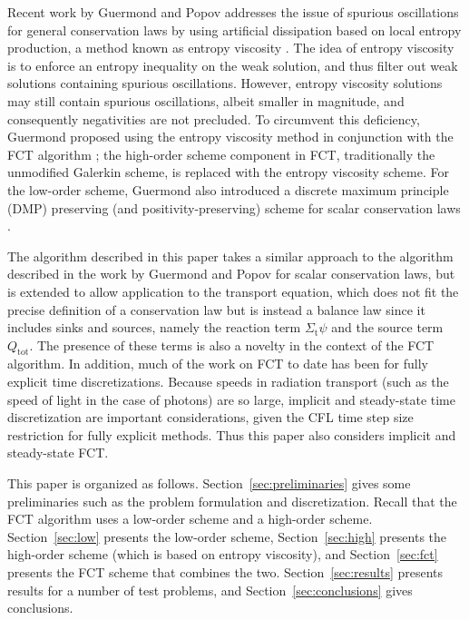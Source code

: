 \documentclass[xchauthor,chkrefs,fixeqskip,GCNS,amsmath,amsthm]{yjcphg}
\theoremstyle{remark}
\begin{document}
Recent work by Guermond and Popov addresses the issue of spurious
oscillations for general conservation laws by using artificial
dissipation based on local entropy production, a method known as entropy
viscosity \cite{guermond_ev}. The idea of entropy viscosity is to
enforce an entropy inequality on the weak solution, and thus filter out
weak solutions containing spurious oscillations. However, entropy
viscosity solutions may still contain spurious oscillations, albeit
smaller in magnitude, and consequently negativities are not precluded.
To circumvent this deficiency, Guermond proposed using the entropy
viscosity method in conjunction with the FCT algorithm
\cite{guermond_secondorder}; the high-order scheme component in FCT,
traditionally the unmodified Galerkin scheme, is replaced with the
entropy viscosity scheme. For the low-order scheme, Guermond also
introduced a discrete maximum principle (DMP) preserving (and
positivity-preserving) scheme for scalar conservation laws
\cite{guermond_firstorder}.

The algorithm described in this paper takes a similar approach to the
algorithm described in the work by Guermond and Popov for scalar
conservation laws, but is extended to allow application to the transport
equation, which does not fit the precise definition of a conservation
law but is instead a balance law since it includes sinks and sources,
namely the reaction term $\Sigma_{\text{t}}\psi$ and the source term
$Q_{\text{tot}}$. The presence of these terms is also a novelty in the
context of the FCT algorithm. In addition, much of the work on FCT to
date has been for fully explicit time discretizations. Because speeds
in radiation transport (such as the speed of light in the case of
photons) are so large, implicit and steady-state time discretization are
important considerations, given the CFL time step size restriction for
fully explicit methods. Thus this paper also considers implicit and
steady-state FCT.

This paper is organized as follows. Section~\ref{sec:preliminaries}
gives some preliminaries such as the problem formulation and
discretization. Recall that the FCT algorithm uses a low-order scheme
and a high-order scheme. Section~\ref{sec:low} presents the low-order
scheme, Section~\ref{sec:high} presents the high-order scheme (which is
based on entropy viscosity), and Section~\ref{sec:fct} presents the FCT
scheme that combines the two. Section~\ref{sec:results} presents results
for a number of test problems, and Section~\ref{sec:conclusions} gives
conclusions.
\end{document}
